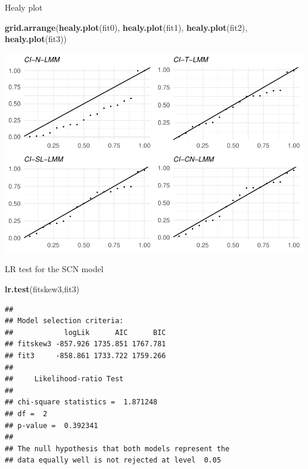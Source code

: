 \documentclass[
  ignorenonframetext,
]{beamer}
\newenvironment{Shaded}{\begin{snugshade}}{\end{snugshade}}
\newcommand{\KeywordTok}[1]{\textcolor[rgb]{0.13,0.29,0.53}{\textbf{#1}}}
\newcommand{\NormalTok}[1]{#1}
\begin{document}
\begin{frame}[fragile]{Healy plot}
\protect\hypertarget{healy-plot}{}

\small

\begin{Shaded}
\begin{Highlighting}[]
\KeywordTok{grid.arrange}\NormalTok{(}\KeywordTok{healy.plot}\NormalTok{(fit0),}
            \KeywordTok{healy.plot}\NormalTok{(fit1),}
            \KeywordTok{healy.plot}\NormalTok{(fit2),}
            \KeywordTok{healy.plot}\NormalTok{(fit3))}
\end{Highlighting}
\end{Shaded}

\begin{center}\includegraphics[width=0.85\linewidth]{codes_files/figure-beamer/healy1-1} \end{center}

\end{frame}

\begin{frame}[fragile]{LR test for the SCN model}
\protect\hypertarget{lr-test-for-the-scn-model}{}

\begin{Shaded}
\begin{Highlighting}[]
\KeywordTok{lr.test}\NormalTok{(fitskew3,fit3)}
\end{Highlighting}
\end{Shaded}

\begin{verbatim}
## 
## Model selection criteria:
##            logLik      AIC      BIC
## fitskew3 -857.926 1735.851 1767.781
## fit3     -858.861 1733.722 1759.266
## 
##     Likelihood-ratio Test
## 
## chi-square statistics =  1.871248 
## df =  2 
## p-value =  0.392341 
## 
## The null hypothesis that both models represent the 
## data equally well is not rejected at level  0.05
\end{verbatim}

\end{frame}
\end{document}
